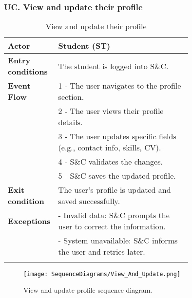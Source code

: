 \subsubsection*{UC\cuc . View and update their profile}
\begin{center}
    \begin{longtable}{|l|p{0.75\linewidth}|}
        \hline
        \textbf{Actor}            & Student (ST) \\
        \hline
        \textbf{Entry conditions} & The student is logged into S\&C. \\
        \hline
        \textbf{Event Flow}       & 1 - The user navigates to the profile section. \\
        & 2 - The user views their profile details. \\
        & 3 - The user updates specific fields (e.g., contact info, skills, CV). \\
        & 4 - S\&C validates the changes. \\
        & 5 - S\&C saves the updated profile. \\
        \hline
        \textbf{Exit condition}   & The user's profile is updated and saved successfully. \\       
        \hline
        \textbf{Exceptions}       & - Invalid data: S\&C prompts the user to correct the information. \\
                                  & - System unavailable: S\&C informs the user and retries later. \\
        \hline
        \caption{View and update their profile}
        \label{tab:view_update_profile_usecase}
    \end{longtable}
\end{center}

\begin{figure}[H]
    \begin{center}
        \texttt{[image: SequenceDiagrams/View\_And\_Update.png]}
        \caption{View and update profile sequence diagram.}
        \label{fig:view_update_profile_seqd}%
    \end{center}
\end{figure}

